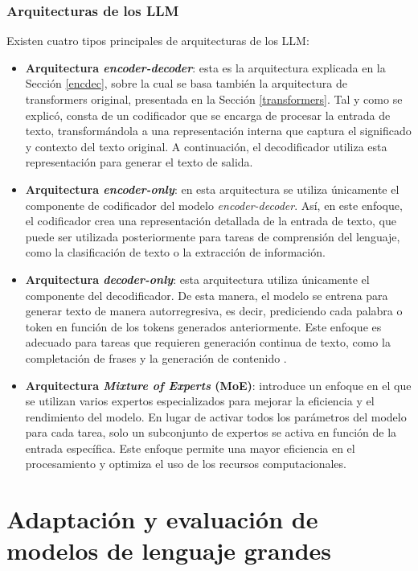 \documentclass[11pt,spanish,listoffigures,listoftables]{tfgetsinf}
\begin{document}
\subsection{Arquitecturas de los LLM}

Existen cuatro tipos principales de arquitecturas de los LLM:

\begin{itemize}
	\item \textbf{Arquitectura \textit{encoder-decoder}}: esta es la arquitectura explicada en la Sección \ref{encdec}, sobre la cual se basa también la arquitectura de transformers original, presentada en la Sección \ref{transformers}. Tal y como se explicó, consta de un codificador que se encarga de procesar la entrada de texto, transformándola a una representación interna que captura el significado y contexto del texto original. A continuación, el decodificador utiliza esta representación para generar el texto de salida.
	\item \textbf{Arquitectura \textit{encoder-only}}: en esta arquitectura se utiliza únicamente el componente de codificador del modelo \textit{encoder-decoder}. Así, en este enfoque, el codificador crea una representación detallada de la entrada de texto, que puede ser utilizada posteriormente para tareas de comprensión del lenguaje, como la clasificación de texto o la extracción de información.
	\item \textbf{Arquitectura \textit{decoder-only}}: esta arquitectura utiliza únicamente el componente del decodificador. De esta manera, el modelo se entrena para generar texto de manera autorregresiva, es decir, prediciendo cada palabra o token en función de los tokens generados anteriormente. Este enfoque es adecuado para tareas que requieren generación continua de texto, como la completación de frases y la generación de contenido \cite{liu2018generatingwikipediasummarizinglong}.
	\item \textbf{Arquitectura \textit{Mixture of Experts} (MoE)}: introduce un enfoque en el que se utilizan varios expertos especializados para mejorar la eficiencia y el rendimiento del modelo. En lugar de activar todos los parámetros del modelo para cada tarea, solo un subconjunto de expertos se activa en función de la entrada específica. Este enfoque permite una mayor eficiencia en el procesamiento y optimiza el uso de los recursos computacionales.
\end{itemize}

\chapter{Adaptación y evaluación de modelos de lenguaje grandes} \label{cap3}
\end{document}
